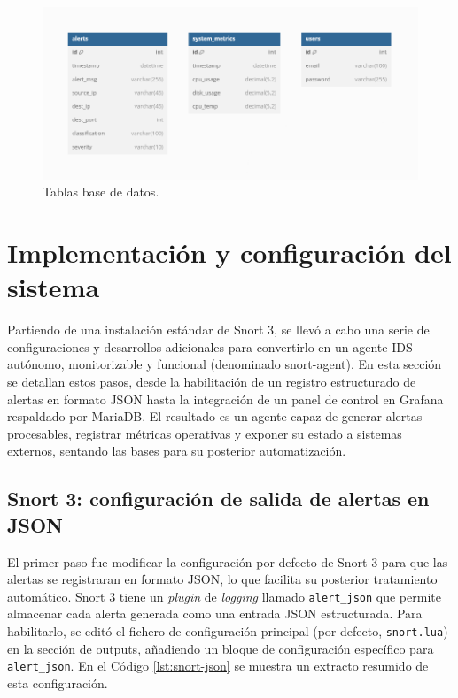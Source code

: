 \documentclass[11pt,a4paper,twoside]{report}
\begin{document}
\begin{figure}[H]
	\centering
	\includegraphics[width=1\textwidth]{documento/10.png}
	\caption{Tablas base de datos.}
	\label{fig:esquema-bd}
\end{figure}

\section{Implementación y configuración del sistema}

Partiendo de una instalación estándar de Snort 3, se llevó a cabo una serie de configuraciones y desarrollos adicionales para convertirlo en un agente IDS autónomo, monitorizable y funcional (denominado snort-agent). En esta sección se detallan estos pasos, desde la habilitación de un registro estructurado de alertas en formato JSON hasta la integración de un panel de control en Grafana respaldado por MariaDB. El resultado es un agente capaz de generar alertas procesables, registrar métricas operativas y exponer su estado a sistemas externos, sentando las bases para su posterior automatización.

\subsection{Snort 3: configuración de salida de alertas en JSON}

El primer paso fue modificar la configuración por defecto de Snort 3 para que las alertas se registraran en formato JSON, lo que facilita su posterior tratamiento automático. Snort 3 tiene un \textit{plugin} de \textit{logging} llamado \texttt{alert\_json} que permite almacenar cada alerta generada como una entrada JSON estructurada. Para habilitarlo, se editó el fichero de configuración principal (por defecto, \texttt{snort.lua}) en la sección de outputs, añadiendo un bloque de configuración específico para \texttt{alert\_json}. En el Código \ref{lst:snort-json} se muestra un extracto resumido de esta configuración.
\end{document}
